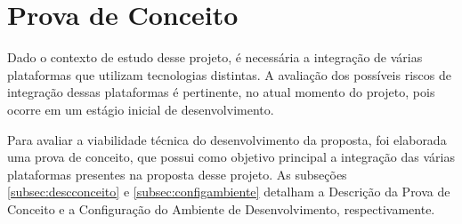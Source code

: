 \begin{table}[H]
\centering
{}
\caption{Cronograma TCC 2}
\label{my-label}
\end{table}

\section{Prova de Conceito}
\label{sec:provaconceito}

Dado o contexto de estudo desse projeto, é necessária a integração de várias
plataformas que utilizam tecnologias distintas. A avaliação dos possíveis
riscos de integração dessas plataformas é pertinente, no atual momento do
projeto, pois ocorre em um estágio inicial de desenvolvimento.

Para avaliar a viabilidade técnica do desenvolvimento da proposta, foi elaborada
uma prova de conceito, que possui como objetivo principal a integração das
várias plataformas presentes na proposta desse projeto. As subseções
\ref{subsec:descconceito} e \ref{subsec:configambiente} detalham a Descrição da
Prova de Conceito e a Configuração do Ambiente de Desenvolvimento,
respectivamente.

